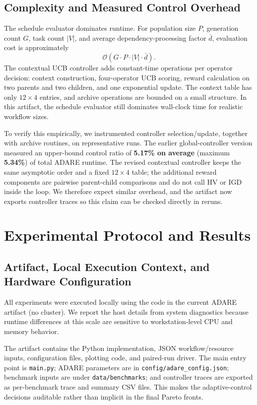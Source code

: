 \documentclass[runningheads]{llncs}
\begin{document}
\subsection{Complexity and Measured Control Overhead}
The schedule evaluator dominates runtime. For population size $P$, generation count $G$, task count $|V|$, and average dependency-processing factor $\bar d$, evaluation cost is approximately
\begin{equation}
\mathcal{O}(G \cdot P \cdot |V| \cdot \bar d).
\end{equation}
The contextual UCB controller adds constant-time operations per operator decision: context construction, four-operator UCB scoring, reward calculation on two parents and two children, and one exponential update. The context table has only $12 \times 4$ entries, and archive operations are bounded on a small structure. In this artifact, the schedule evaluator still dominates wall-clock time for realistic workflow sizes.

To verify this empirically, we instrumented controller selection/update, together with archive routines, on representative runs. The earlier global-controller version measured an upper-bound control ratio of \textbf{5.17\% on average} (maximum \textbf{5.34\%}) of total ADARE runtime. The revised contextual controller keeps the same asymptotic order and a fixed $12 \times 4$ table; the additional reward components are pairwise parent-child comparisons and do not call HV or IGD inside the loop. We therefore expect similar overhead, and the artifact now exports controller traces so this claim can be checked directly in reruns.

\section{Experimental Protocol and Results}
\subsection{Artifact, Local Execution Context, and Hardware Configuration}
All experiments were executed locally using the code in the current ADARE artifact (no cluster). We report the host details from system diagnostics because runtime differences at this scale are sensitive to workstation-level CPU and memory behavior.

The artifact contains the Python implementation, JSON workflow/resource inputs, configuration files, plotting code, and paired-run driver. The main entry point is \texttt{main.py}; ADARE parameters are in \texttt{config/adare\_config.json}; benchmark inputs are under \texttt{data/benchmarks}; and controller traces are exported as per-benchmark trace and summary CSV files. This makes the adaptive-control decisions auditable rather than implicit in the final Pareto fronts.
\end{document}
